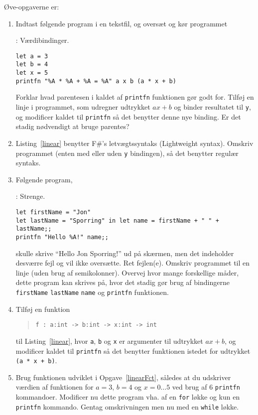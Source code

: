 \documentclass[a4paper,12pt]{article}
\begin{document}
Øve-opgaverne er:
\begin{enumerate}[label=3ø.\arabic*,start=0]
\item Indtast følgende program i en tekstfil, og oversæt og kør programmet 
  \begin{codeNOutput}[label=linear]{: Værdibindinger.}
\begin{lstlisting}
let a = 3
let b = 4
let x = 5
printfn "%A * %A + %A = %A" a x b (a * x + b)
\end{lstlisting}
\end{codeNOutput}
Forklar hvad parentesen i kaldet af \lstinline!printfn! funktionen gør godt for. Tilføj en linje i programmet, som udregner udtrykket $ax+b$ og binder resultatet til \lstinline!y!, og modificer kaldet til \lstinline!printfn! så det benytter denne nye binding. Er det stadig nødvendigt at bruge parentes?
\item Listing~\ref{linear} benytter F\#'s letvægtssyntaks (Lightweight syntax). Omskriv programmet (enten med eller uden \lstinline!y! bindingen), så det benytter regulær syntaks.
\item Følgende program,
  \begin{codeNOutput}{: Strenge.}
\begin{lstlisting}
let firstName = "Jon"
let lastName = "Sporring" in let name = firstName + " " + lastName;;
printfn "Hello %A!" name;;
\end{lstlisting}
\end{codeNOutput}
skulle skrive ``Hello Jon Sporring!'' ud på skærmen, men det indeholder desværre fejl og vil ikke oversætte. Ret fejlen(e). Omskriv programmet til en linje (uden brug af semikolonner). Overvej hvor mange forskellige måder, dette program kan skrives på, hvor det stadig gør brug af bindingerne \lstinline!firstName! \lstinline!lastName! \lstinline!name! og \lstinline!printfn! funktionen. 
\item \label{linearFct} Tilføj en funktion
  \begin{quote}
    \mbox{\lstinline!f : a:int -> b:int -> x:int -> int!}
  \end{quote}
til Listing~\ref{linear}, hvor \lstinline!a!, \lstinline!b! og \lstinline!x! er argumenter til udtrykket $ax+b$, og modificer kaldet til \lstinline!printfn! så det benytter funktionen istedet for udtrykket \lstinline!(a * x + b)!.
\item \label{table} Brug funktionen udviklet i Opgave~\ref{linearFct}, således at du udskriver værdien af funktionen for $a=3$, $b=4$ og $x=0\ldots5$ ved brug af 6 \lstinline!printfn! kommandoer. Modificer nu dette program vha. af en \lstinline!for! løkke og kun en \lstinline!printfn! kommando. Gentag omskrivningen men nu med en \lstinline!while! løkke.

\end{enumerate}
\end{document}
